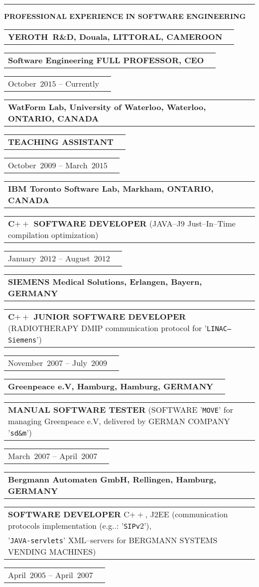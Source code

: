 \documentclass[9pt,a4paper]{article} %
\makeatletter
\newcommand{\headerrow}[2]
{\begin{tabular*}{\linewidth}{l@{\extracolsep{\fill}}r}
	#1 &
	#2 \\
\end{tabular*}}
\newcommand{\headerrowONE}[1]{\headerrow{#1}{}}
\newcommand{\cplusplus}{C$++$\xspace}
\newcommand{\jtwoee}{J$2$EE\xspace}
\newcommand{\cvitemdate}[2]{#1~$#2$\xspace}
\newcommand{\cvitempositionheld}[1]{\textbf{#1}\xspace}
\makeatother
\begin{document}
\vspace{1em}


\hrule
\begin{center}
{\large \textbf{PROFESSIONAL EXPERIENCE IN SOFTWARE ENGINEERING}}
\end{center}

\vspace{0.5em}

\headerrowONE{\textbf{YEROTH~R\&D, Douala, LITTORAL, CAMEROON}}
\headerrowONE{\cvitempositionheld{Software Engineering FULL PROFESSOR, CEO}}
\headerrowONE{\cvitemdate{October}{2015} -- Currently}	

\vspace{0.3em}

\headerrowONE{\textbf{WatForm Lab, University of Waterloo, Waterloo, ONTARIO, CANADA}}	
\headerrowONE{\cvitempositionheld{TEACHING ASSISTANT}}
\headerrowONE{\cvitemdate{October}{2009} -- \cvitemdate{March}{2015}}
	
\vspace{0.3em}

\headerrowONE{\textbf{IBM Toronto Software Lab, Markham, ONTARIO, CANADA}}	
\headerrowONE{\cvitempositionheld{\cplusplus SOFTWARE DEVELOPER} (JAVA--J$9$ Just--In--Time compilation
optimization)}
\headerrowONE{\cvitemdate{January}{2012} -- \cvitemdate{August}{2012}}	

\vspace{0.3em}

\headerrowONE{\textbf{SIEMENS Medical Solutions, Erlangen, Bayern, GERMANY}}	
\headerrowONE{\cvitempositionheld{\cplusplus JUNIOR SOFTWARE DEVELOPER} (RADIOTHERAPY DMIP
communication protocol for '\texttt{LINAC--Siemens}')}
\headerrowONE{\cvitemdate{November}{2007} -- \cvitemdate{July}{2009}}	
	
\vspace{0.3em}

\headerrowONE{\textbf{Greenpeace e.V, Hamburg, Hamburg, GERMANY}}	
\headerrowONE{\cvitempositionheld{MANUAL SOFTWARE TESTER} 
(SOFTWARE '\texttt{MOVE}' for managing Greenpeace e.V, delivered by GERMAN COMPANY '\texttt{sd\&m}')}
\headerrowONE{\cvitemdate{March}{2007} -- \cvitemdate{April}{2007}}	

\vspace{0.3em}
\headerrowONE{\textbf{Bergmann Automaten GmbH, Rellingen, Hamburg, GERMANY}}	
\headerrowONE{\cvitempositionheld{SOFTWARE DEVELOPER} \cplusplus, \jtwoee 
(communication protocols implementation (e.g..: '\texttt{SIPv$2$}'), \\
'\texttt{JAVA-servlets}' XML--servers for BERGMANN SYSTEMS VENDING MACHINES)}
\headerrowONE{\cvitemdate{April}{2005} -- \cvitemdate{April}{2007}}	
	
\end{document}
